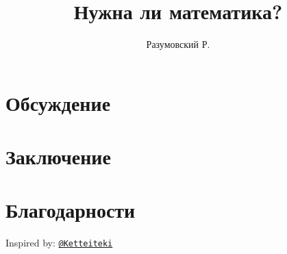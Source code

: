 \documentclass[12pt,a4paper]{article}
\title{Нужна ли математика?}
\date{} %
\author{Разумовский Р.}
\numberwithin{equation}{section}
\begin{document}
    \maketitle

    \begin{abstract}
        
    \end{abstract}


    \section{Обсуждение} \label{sec:introduction}
    


    \section{Заключение}\label{sec:conclusions}
    

    \section{Благодарности}\label{sec:ack}

    Inspired by: \href{https://github.com/Ketteiteki}{\texttt{@Ketteiteki}}
\end{document}
